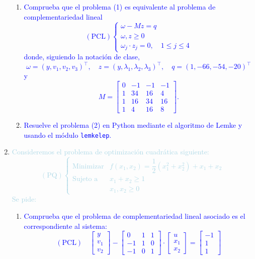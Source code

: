 \documentclass[12pt]{article}
\newcommand{\lb}[1]{\textcolor{lightblue}{#1}}
\newcommand{\db}[1]{\textcolor{blue}{#1}}
\begin{document}
\begin{enumerate}[label=\color{red}\arabic*.]
\begin{enumerate}[label=\color{red}\alph*)]
    	\item \db{Comprueba que el problema (1) es equivalente al problema de complementariedad lineal \begin{equation}
    	(\mathrm{PCL})\begin{cases}
    	\omega-Mz=q\\
    	\omega,z\ge0\\
    	\omega_j\cdot z_j=0,\quad 1\le j\le4
    	\end{cases}
    	\end{equation}donde, siguiendo la notación de clase, \[ \omega=(y,v_1,v_2,v_3)^\intercal,\quad z=(y,\lambda_1,\lambda_2,\lambda_3)^\intercal,\quad q=(1,-66,-54,-20)^\intercal \]y\[ M=\begin{bmatrix}
    	0 & -1 & -1 & -1 \\
    	1 & 34 & 16 & 4 \\
    	1 & 16 & 34 & 16 \\
    	1 & 4 & 16 & 8
    	\end{bmatrix}. \]}
    	
    	\item \db{Resuelve el problema (2) en Python mediante el algoritmo de Lemke y usando el módulo \texttt{lemkelep}.}
    	
    \end{enumerate}
    \item \lb{Consideremos el problema de optimización cuadrática siguiente: \[ (\mathrm{PQ})\begin{cases}
    \text{Minimizar} & f(x_{1},x_{2})=\dfrac{1}{2}(x_{1}^{2}+x_{2}^{2})+x_{1}+x_{2}\\
    \text{Sujeto a} & x_1+x_2\ge1\\
     & x_1,x_2\ge0
    \end{cases} \]Se pide:}
    \begin{enumerate}[label=\color{red}\alph*)]
    	\item \db{Comprueba que el problema de complementariedad lineal asociado es el correspondiente al sistema: \[ (\mathrm{PCL})\quad\begin{bmatrix}
    	y\\
    	v_{1}\\
    	v_{2}
    	\end{bmatrix}-\begin{bmatrix}
    	0 & 1 & 1 \\
    	-1 & 1 & 0 \\
    	-1 & 0 & 1
    	\end{bmatrix}\cdot\begin{bmatrix}
    	u\\
    	x_1\\
    	x_2
    	\end{bmatrix} =\begin{bmatrix}
    	-1 \\
    	1 \\
    	1
    	\end{bmatrix}\]}
    	

\end{enumerate}
\end{enumerate}
\end{document}
